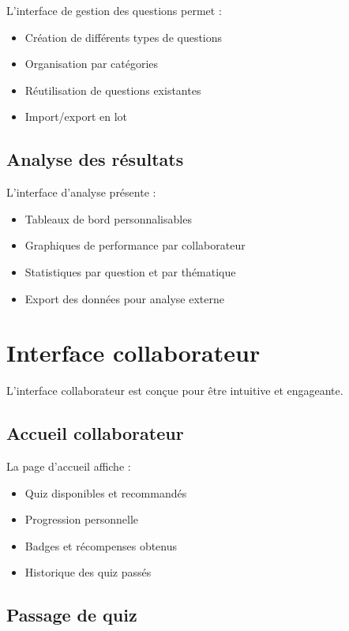 \documentclass[12pt,a4paper]{report}
\begin{document}
L'interface de gestion des questions permet :

\begin{itemize}
    \item Création de différents types de questions
    \item Organisation par catégories
    \item Réutilisation de questions existantes
    \item Import/export en lot
\end{itemize}

\subsection{Analyse des résultats}

L'interface d'analyse présente :

\begin{itemize}
    \item Tableaux de bord personnalisables
    \item Graphiques de performance par collaborateur
    \item Statistiques par question et par thématique
    \item Export des données pour analyse externe
\end{itemize}

\section{Interface collaborateur}

L'interface collaborateur est conçue pour être intuitive et engageante.

\subsection{Accueil collaborateur}

La page d'accueil affiche :

\begin{itemize}
    \item Quiz disponibles et recommandés
    \item Progression personnelle
    \item Badges et récompenses obtenus
    \item Historique des quiz passés
\end{itemize}

\subsection{Passage de quiz}
\end{document}
